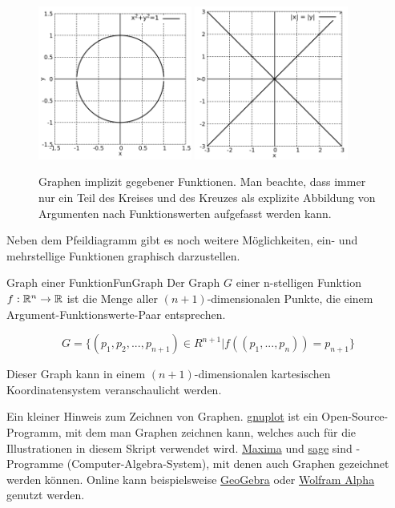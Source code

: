 \begin{figure}
    \centering
    \includegraphics[width=0.45\textwidth]{./gnuplot/implicit-fun-circle}
    \includegraphics[width=0.45\textwidth]{./gnuplot/implicit-fun-cross}
    \caption[Graphen impliziter Funktionen]{Graphen implizit gegebener Funktionen. Man beachte, dass immer nur ein Teil des Kreises und des Kreuzes als explizite Abbildung von Argumenten nach Funktionswerten aufgefasst werden kann.}
    \label{fig:ImplFun}
\end{figure}

Neben dem Pfeildiagramm gibt es noch weitere Möglichkeiten, ein- und mehrstellige Funktionen graphisch darzustellen.

\begin{definition}{Graph einer Funktion}{FunGraph}
    Der Graph $G$ einer n-stelligen Funktion $f: \mathbb{R}^n \to \mathbb{R}$ ist die Menge aller $(n+1)$-dimensionalen Punkte, die einem Argument-Funktionswerte-Paar entsprechen.

    $$
    G = \lbrace (p_1, p_2, ..., p_{n+1}) \in R^{n+1} | f((p_1, ..., p_n)) = p_{n+1} \rbrace
    $$

    Dieser Graph kann in einem $(n+1)$-dimensionalen kartesischen Koordinatensystem veranschaulicht werden.
\end{definition}

Ein kleiner Hinweis zum Zeichnen von Graphen. \href{http://www.gnuplot.info/}{gnuplot} ist ein Open-Source-Programm, mit dem man Graphen zeichnen kann, welches auch für die Illustrationen in diesem Skript verwendet wird. \href{http://maxima.sourceforge.net/}{Maxima} und \href{https://www.sagemath.org/}{sage} sind -Programme (Computer-Algebra-System), mit denen auch Graphen gezeichnet werden können. Online kann beispielsweise \href{https://www.geogebra.org/graphing}{GeoGebra} oder \href{https://www.wolframalpha.com/examples/mathematics/plotting-and-graphics/}{Wolfram Alpha} genutzt werden.


